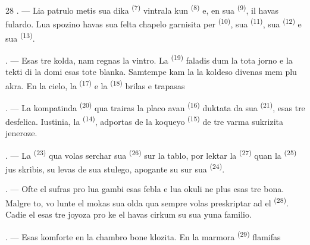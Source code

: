 \begin{VUpage}[30]{28}
. --- Lia patrulo metis sua dika  \textsuperscript{(7)}\nl
vintrala kun  \textsuperscript{(8)} e, en sua \cc
{} \textsuperscript{(9)}, il havas fulardo. Lua spozino havas\nl
sua felta chapelo garnisita per  \textsuperscript{(10)}, sua\nl
{} \textsuperscript{(11)}, sua  \textsuperscript{(12)} e sua  \textsuperscript{(13)}.

. --- Esas tre kolda, nam regnas la vintro.\nl
La  \textsuperscript{(19)} faladis dum la tota jorno e la tekti\nl
di la domi esas tote blanka. Samtempe kam\nl
la  la koldeso divenas mem plu akra.\nl
En la cielo, la  \textsuperscript{(17)} e la  \textsuperscript{(18)} brilas e\nl
trapasas 

\VUsaut{4.2mm}
\VUsaut{3.0mm}

. --- La kompatinda  \textsuperscript{(20)} qua trairas\nl
la placo avan  \textsuperscript{(16)} duktata da sua \cc
{} \textsuperscript{(21)}, esas tre desfelica. Iustinia, la \cc
{} \textsuperscript{(14)}, adportas de la koqueyo  \textsuperscript{(15)} de\nl
tre varma  sukrizita jeneroze.

. --- La  \textsuperscript{(23)} qua volas serchar sua\nl
{} \textsuperscript{(26)} sur la tablo, por lektar la\nl
{} \textsuperscript{(27)} quan la  \textsuperscript{(25)} jus skribis,\nl
su levas de sua stulego, apogante su sur sua\nl
{} \textsuperscript{(24)}.

. --- Ofte el sufras pro \nl
{} lua gambi esas febla e\nl
lua okuli ne plus esas tre bona. Malgre to, vo\cc
lunte el mokas sua olda  qua sempre\nl
volas preskriptar ad el  \textsuperscript{(28)}. Cadie el\nl
esas tre joyoza pro ke el havas cirkum su sua\nl
yuna familio.

. --- Esas komforte en la chambro bone\nl
klozita. En la marmora  \textsuperscript{(29)} flamifas
\parplein
\end{VUpage}

